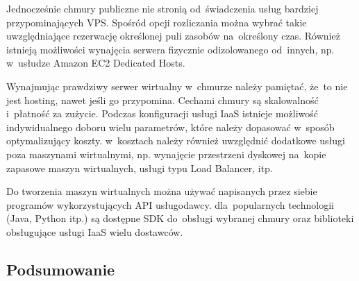 \documentclass[12pt,a4paper,twoside,titlepage,openright]{book}
\begin{document}
Jednocześnie chmury publiczne nie stronią od~świadczenia usług bardziej przypominających VPS. Spośród opcji rozliczania można wybrać takie uwzględniające rezerwację określonej puli zasobów na~określony czas. Również istnieją możliwości wynajęcia serwera fizycznie odizolowanego od~innych, np. w~usłudze Amazon EC2 Dedicated Hosts.

Wynajmując prawdziwy serwer wirtualny w~chmurze należy pamiętać, że~to nie jest hosting, nawet jeśli go przypomina. Cechami chmury są skalowalność i~płatność za zużycie. Podczas konfiguracji usługi IaaS istnieje możliwość indywidualnego doboru wielu parametrów, które należy dopasować w~sposób optymalizujący koszty. w~kosztach należy również uwzględnić dodatkowe usługi poza maszynami wirtualnymi, np. wynajęcie przestrzeni dyskowej na~kopie zapasowe maszyn wirtualnych, usługi typu Load Balancer, itp.

Do tworzenia maszyn wirtualnych można używać napisanych przez siebie programów wykorzystujących API usługodawcy. dla~popularnych technologii (Java, Python itp.) są dostępne SDK do~obsługi wybranej chmury oraz biblioteki obsługujące usługi IaaS wielu dostawców.

\subsection*{Podsumowanie}
\end{document}
